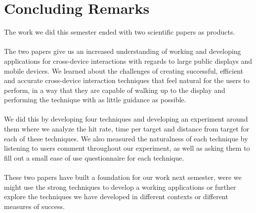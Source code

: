 \section*{Concluding Remarks}

The work we did this semester ended with two scientific papers as products. \\\\
The two papers give us an increased understanding of working and developing applications for cross-device interactions with regards to large public displays and mobile devices.
We learned about the challenges of creating successful, efficient and accurate cross-device interaction techniques that feel natural for the users to perform, in a way that they are capable of walking up to the display and performing the technique with as little guidance as possible. \\\\
We did this by developing four techniques and developing an experiment around them where we analyze the hit rate, time per target and distance from target for each of these techniques.
We also measured the naturalness of each technique by listening to users comment throughout our experiment, as well as asking them to fill out a small ease of use questionnaire for each technique. \\\\
These two papers have built a foundation for our work next semester, were we might use the strong techniques to develop a working applications or further explore the techniques we have developed in different contexts or different measures of success. 